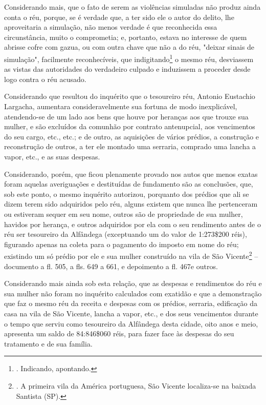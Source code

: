 Considerando mais, que o fato de serem as violências simuladas não
produz ainda conta o réu, porque, se é verdade que, a ter sido ele o
autor do delito, lhe aproveitaria a simulação, não menos verdade é que
reconhecida essa circunstância, muito o comprometia; e, portanto, estava
no interesse de quem abrisse cofre com gazua, ou com outra chave que não
a do réu, "deixar sinais de simulação", facilmente reconhecíveis, que
indigitando\footnote{. Indicando, apontando.} o mesmo réu, desviassem as
vistas das autoridades do verdadeiro culpado e induzissem a proceder
desde logo contra o réu acusado.

Considerando que resultou do inquérito que o tesoureiro réu, Antonio
Eustachio Largacha, aumentara consideravelmente sua fortuna de modo
inexplicável, atendendo-se de um lado aos bens que houve por heranças
aos que trouxe sua mulher, e são excluídos da comunhão por contrato
antenupcial, aos vencimentos do seu cargo, etc., etc.; e de outro, as
aquisições de vários prédios, a construção e reconstrução de outros, a
ter ele montado uma serraria, comprado uma lancha a vapor, etc., e as
suas despesas.

Considerando, porém, que ficou plenamente provado nos autos que menos
exatas foram aquelas averiguações e destituídas de fundamento são as
conclusões, que, sob este ponto, o mesmo inquérito autorizou, porquanto
dos prédios que ali se dizem terem sido adquiridos pelo réu, alguns
existem que nunca lhe pertenceram ou estiveram sequer em seu nome,
outros são de propriedade de sua mulher, havidos por herança, e outros
adquiridos por ela com o seu rendimento antes de o réu ser tesoureiro da
Alfândega (exceptuando um do valor de 1:273\$200 réis), figurando apenas
na coleta para o pagamento do imposto em nome do réu; existindo um só
prédio por ele e sua mulher construído na vila de São Vicente\footnote{.
  A primeira vila da América portuguesa, São Vicente localiza-se na
  baixada Santista (SP).} -- documento a fl. 505, a fls. 649 a 661, e
depoimento a fl. 467e outros.

Considerando mais ainda sob esta relação, que as despesas e rendimentos
do réu e sua mulher não foram no inquérito calculados com exatidão e que
a demonstração que faz o mesmo réu da receita e despesas com os prédios,
serraria, edificação da casa na vila de São Vicente, lancha a vapor,
etc., e dos seus vencimentos durante o tempo que serviu como tesoureiro
da Alfândega desta cidade, oito anos e meio, apresenta um saldo de
84:846\$060 réis, para fazer face às despesas do seu tratamento e de sua
família.

